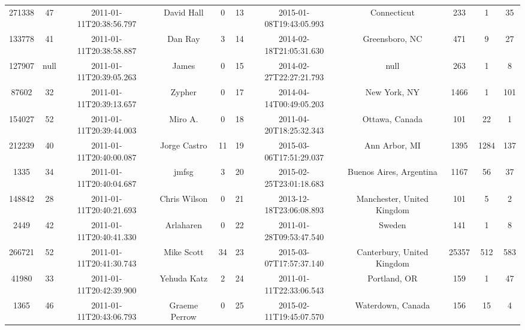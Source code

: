 \documentclass[12pt,a4paper,twoside,openright,titlepage,final]{article}
\begin{document}
\begin{landscape}
\begin{center}
\begin{longtable}{@{\extracolsep{\fill}}*{11}{c}}
			271338    & 47   & 2011-01-11T20:38:56.797 & David Hall            & 0         & 13    & 2015-01-08T19:43:05.993 & Connecticut                      & 233        & 1       & 35    \\
			133778    & 41   & 2011-01-11T20:38:58.887 & Dan Ray               & 3         & 14    & 2014-02-18T21:05:31.630 & Greensboro, NC                   & 471        & 9       & 27    \\
			127907    & null & 2011-01-11T20:39:05.263 & James                 & 0         & 15    & 2014-02-27T22:27:21.793 & null                             & 263        & 1       & 8     \\
			87602     & 32   & 2011-01-11T20:39:13.657 & Zypher                & 0         & 17    & 2014-04-14T00:49:05.203 & New York, NY                     & 1466       & 1       & 101   \\
			154027    & 52   & 2011-01-11T20:39:44.003 & Miro A.               & 0         & 18    & 2011-04-20T18:25:32.343 & Ottawa, Canada                   & 101        & 22      & 1     \\
			212239    & 40   & 2011-01-11T20:40:00.087 & Jorge Castro          & 11        & 19    & 2015-03-06T17:51:29.037 & Ann Arbor, MI                    & 1395       & 1284    & 137   \\
			1335      & 34   & 2011-01-11T20:40:04.687 & jmfsg                 & 3         & 20    & 2015-02-25T23:01:18.683 & Buenos Aires, Argentina          & 1167       & 56      & 37    \\
			148842    & 28   & 2011-01-11T20:40:21.693 & Chris Wilson          & 0         & 21    & 2013-12-18T23:06:08.893 & Manchester, United Kingdom       & 101        & 5       & 2     \\
			2449      & 42   & 2011-01-11T20:40:41.330 & Arlaharen             & 0         & 22    & 2011-01-28T09:53:47.540 & Sweden                           & 141        & 1       & 8     \\
			266721    & 52   & 2011-01-11T20:41:30.743 & Mike Scott            & 34        & 23    & 2015-03-07T17:57:37.140 & Canterbury, United Kingdom       & 25357      & 512     & 583   \\
			41980     & 33   & 2011-01-11T20:42:39.900 & Yehuda Katz           & 2         & 24    & 2011-01-11T22:33:06.543 & Portland, OR                     & 159        & 1       & 47    \\
			1365      & 46   & 2011-01-11T20:43:06.793 & Graeme Perrow         & 0         & 25    & 2015-02-11T19:45:07.570 & Waterdown, Canada                & 156        & 15      & 4     \\

\end{longtable}
\end{center}
\end{landscape}
\end{document}
